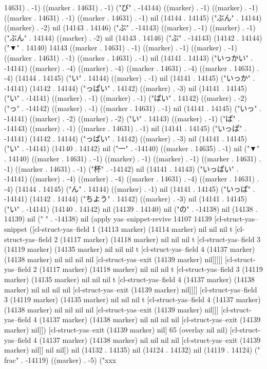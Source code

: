 14631) . -1) ((marker . 14631) . -1) ("び" . -14144) ((marker) . -1) ((marker) . -1) ((marker . 14631) . -1) ((marker . 14631) . -1) nil (14144 . 14145) ("ぶん" . 14144) ((marker) . -2) nil (14143 . 14146) ("ぶ" . -14143) ((marker) . -1) ((marker) . -1) ("ぶん" . 14144) ((marker) . -2) nil (14143 . 14146) ("ぶ" . -14143) (14142 . 14144) ("▼" . 14140) 14143 ((marker . 14631) . -1) ((marker) . -1) ((marker) . -1) ((marker . 14631) . -1) ((marker . 14631) . -1) nil (14141 . 14143) ("いっかい" . -14141) ((marker) . -4) ((marker) . -4) ((marker . 14631) . -4) ((marker . 14631) . -4) (14144 . 14145) ("い" . 14144) ((marker) . -1) nil (14141 . 14145) ("いっか" . -14141) (14142 . 14144) ("っぱい" . 14142) ((marker) . -3) nil (14141 . 14145) ("い" . -14141) ((marker) . -1) ((marker) . -1) ("ぱい" . 14142) ((marker) . -2) ("っ" . -14142) ((marker) . -1) ((marker . 14631) . -1) nil (14141 . 14145) ("いっ" . -14141) ((marker) . -2) ((marker) . -2) ("い" . 14143) ((marker) . -1) ("ぱ" . -14143) ((marker) . -1) ((marker . 14631) . -1) nil (14141 . 14145) ("いっぱ" . -14141) (14142 . 14144) ("っぱい" . 14142) ((marker) . -3) nil (14141 . 14145) ("い" . -14141) (14140 . 14142) nil ("一" . -14140) ((marker . 14635) . -1) nil ("▼" . 14140) ((marker . 14631) . -1) ((marker) . -1) ((marker) . -1) ((marker . 14631) . -1) ((marker . 14631) . -1) ("杯" . -14142) nil (14141 . 14143) ("いっぱい" . -14141) ((marker) . -4) ((marker) . -4) ((marker . 14631) . -4) ((marker . 14631) . -4) (14144 . 14145) ("ん" . 14144) ((marker) . -1) nil (14141 . 14145) ("いっぱ" . -14141) (14142 . 14144) ("ちよう" . 14142) ((marker) . -3) nil (14141 . 14145) ("い" . -14141) (14140 . 14142) nil (14139 . 14140) nil ("の" . -14138) nil (14138 . 14139) nil (" " . -14138) nil (apply yas--snippet-revive 14107 14139 [cl-struct-yas--snippet ([cl-struct-yas--field 1 (14113 marker) (14114 marker) nil nil nil t [cl-struct-yas--field 2 (14117 marker) (14118 marker) nil nil nil t [cl-struct-yas--field 3 (14119 marker) (14135 marker) nil nil nil t [cl-struct-yas--field 4 (14137 marker) (14138 marker) nil nil nil nil [cl-struct-yas--exit (14139 marker) nil]]]]] [cl-struct-yas--field 2 (14117 marker) (14118 marker) nil nil nil t [cl-struct-yas--field 3 (14119 marker) (14135 marker) nil nil nil t [cl-struct-yas--field 4 (14137 marker) (14138 marker) nil nil nil nil [cl-struct-yas--exit (14139 marker) nil]]]] [cl-struct-yas--field 3 (14119 marker) (14135 marker) nil nil nil t [cl-struct-yas--field 4 (14137 marker) (14138 marker) nil nil nil nil [cl-struct-yas--exit (14139 marker) nil]]] [cl-struct-yas--field 4 (14137 marker) (14138 marker) nil nil nil nil [cl-struct-yas--exit (14139 marker) nil]]) [cl-struct-yas--exit (14139 marker) nil] 65 (overlay nil nil) [cl-struct-yas--field 4 (14137 marker) (14138 marker) nil nil nil nil [cl-struct-yas--exit (14139 marker) nil]] nil nil]) nil (14132 . 14135) nil (14124 . 14132) nil (14119 . 14124) ("\\frac" . -14119) ((marker) . -5) ("xxx

